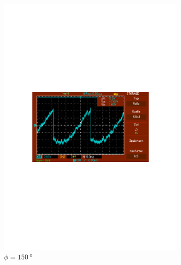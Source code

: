 \begin{figure}
\begin{subfigure}{0.3\textwidth}
      \includegraphics[width=\textwidth]{Daten/Noise/150.pdf}
      \caption{$\phi = \SI{150}{\degree}$}
      \label{fig:150n}
  \end{subfigure}
  \par\medskip %
  \begin{subfigure}{0.3\textwidth}
      \centering

\end{subfigure}
\end{figure}
